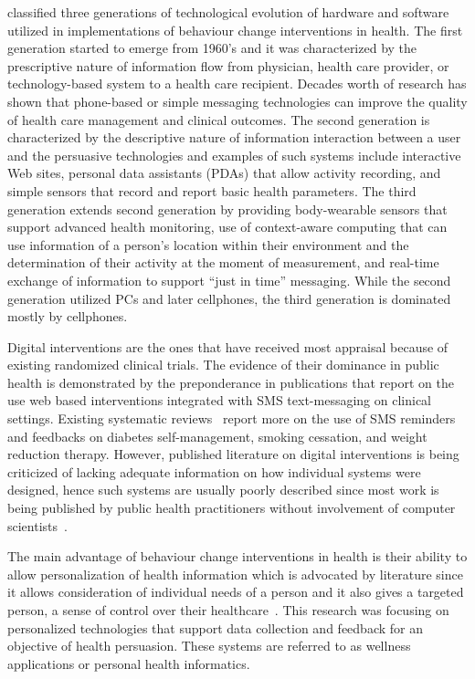 \cite{chatterjee2009healthy} classified three generations  of technological evolution of hardware and software utilized in implementations of behaviour change interventions in health. The first generation started to emerge from 1960's and it was characterized by the prescriptive nature of information flow from physician, health care provider, or technology-based system to a health care recipient. Decades worth of research has shown that phone-based or simple messaging technologies can improve the quality of health care management and clinical outcomes. The second generation is characterized by the descriptive nature of information interaction between a user and the persuasive technologies and examples of such systems include interactive Web sites, personal data assistants (PDAs) that allow activity recording, and simple sensors that record and report basic health parameters. The third generation extends second generation by providing body-wearable sensors that support advanced health monitoring, use of context-aware computing that can use information of a person's location within their environment and the determination of their activity at the moment of measurement, and real-time exchange of information to support “just in time” messaging.  While the second generation utilized PCs and later cellphones, the third generation is dominated mostly by cellphones.

Digital interventions are the ones that have received most appraisal because of existing randomized clinical trials. The evidence of their dominance in public health is demonstrated by the preponderance in publications that report on the use web based interventions integrated with SMS text-messaging on clinical settings. Existing systematic reviews~\citep{cole2010text,fjeldsoe2009behavior,krishna2009healthcare} report more on the use of SMS reminders and feedbacks on diabetes self-management, smoking cessation, and weight reduction therapy. However, published literature on digital interventions is being criticized of lacking adequate information on how individual systems were designed, hence such systems are usually poorly described since most work is being published by public health practitioners without involvement of computer scientists~\citep{Oinas-Kukkonen:foundation}.

The main advantage of behaviour change interventions in health is their ability to allow personalization of health information which is advocated by literature since it allows consideration of individual needs of a person and it also gives a targeted person, a  sense of control over their healthcare~\citep{mccallum2012gamification}. This research was focusing on personalized technologies that support data collection and feedback for an objective of health persuasion. These systems are referred to as wellness applications or personal health informatics. 

